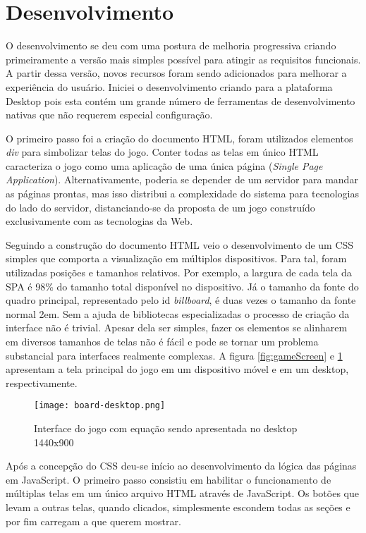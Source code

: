 \section{Desenvolvimento}

O desenvolvimento se deu com uma postura de melhoria progressiva
criando primeiramente  a versão mais simples possível para atingir as
requisitos funcionais. A partir dessa versão, novos recursos foram
sendo adicionados para melhorar a experiência do usuário. Iniciei o
desenvolvimento criando para a plataforma Desktop pois esta contém
um grande número de ferramentas de desenvolvimento nativas que não
requerem especial configuração.

O primeiro passo foi a criação do documento HTML, foram utilizados
elementos \textit{div} para simbolizar telas do jogo. Conter todas as
telas em único HTML caracteriza o jogo como uma aplicação de uma
única página (\textit{Single Page Application}). Alternativamente,
poderia se depender de um servidor para mandar as páginas prontas,
mas isso distribui a complexidade do sistema para tecnologias do
lado do servidor, distanciando-se da proposta de um jogo construído
exclusivamente com as tecnologias da Web.

Seguindo a construção do documento HTML veio o desenvolvimento de um
CSS simples que comporta a visualização em múltiplos dispositivos.
Para tal, foram utilizadas posições e tamanhos relativos. Por exemplo,
a largura de cada tela da SPA é 98\% do tamanho total disponível no
dispositivo. Já o tamanho da fonte do quadro principal, representado
pelo id \textit{billboard}, é duas vezes o tamanho da fonte normal 2em.
Sem a ajuda de bibliotecas especializadas o processo de criação da
interface não é trivial. Apesar dela ser simples, fazer os elementos
se alinharem em diversos tamanhos de telas não é fácil e pode se
tornar um problema substancial para interfaces realmente complexas.
A figura \ref{fig:gameScreen} e \ref{fig:gameScreenDesktop} apresentam
a tela principal do jogo em um dispositivo móvel e em um desktop, respectivamente.

\begin{figure}[H]
    \centering
    \texttt{[image: board-desktop.png]}
	\caption{Interface do jogo com equação sendo apresentada no desktop 1440x900}
    \label{fig:gameScreenDesktop}
\end{figure}

Após a concepção do CSS deu-se início ao desenvolvimento da lógica
das páginas em JavaScript. O primeiro passo consistiu em habilitar o
funcionamento de múltiplas telas em um único arquivo HTML através
de JavaScript. Os botões que levam a outras telas, quando clicados,
simplesmente escondem todas as seções e por fim carregam a que querem
mostrar.

